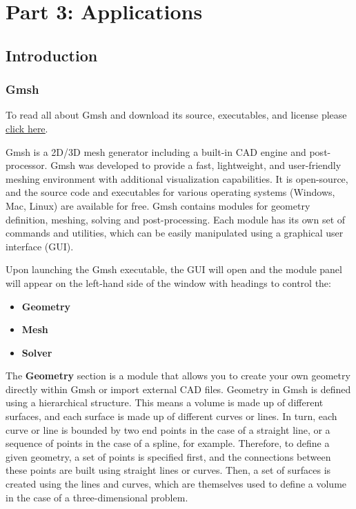 \part{Part 3: Applications}

\graphicspath{ {./Pictures/} }

\chapter{Introduction}
\label{ch:intro for tutorials}
\section{Gmsh}
\begin{gmshnote}
	To read all about Gmsh and download its source, executables, and license please \href{http://gmsh.info}{\underline{click here}}.
\end{gmshnote}
Gmsh is a 2D/3D mesh generator including a built-in CAD engine and post-processor. Gmsh was developed to provide a fast, lightweight, and user-friendly meshing environment with additional visualization capabilities. It is open-source, and the source code and executables for various operating systems (Windows, Mac, Linux) are available for free. Gmsh contains modules for geometry definition, meshing, solving and post-processing. Each module has its own set of commands and utilities, which can be easily manipulated using a graphical user interface (GUI).

Upon launching the Gmsh executable, the GUI will open and the module panel will appear on the left-hand side of the window with headings to control the:
\begin{itemize}
    \item \textbf{Geometry}
    \item \textbf{Mesh}
    \item \textbf{Solver}
\end{itemize}
The \textbf{Geometry} section is a module that allows you to create your own geometry directly within Gmsh or import external CAD files. Geometry in Gmsh is defined using a hierarchical structure. This means a volume is made up of different surfaces, and each surface is made up of different curves or lines. In turn, each curve or line is bounded by two end points in the case of a straight line, or a sequence of points in the case of a spline, for example. Therefore, to define a given geometry, a set of points is specified first, and the connections between these points are built using straight lines or curves. Then, a set of surfaces is created using the lines and curves, which are themselves used to define a volume in the case of a three-dimensional problem.

